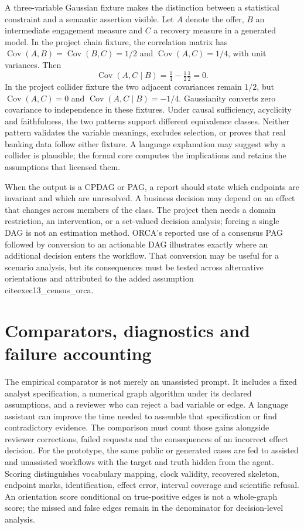 A three-variable Gaussian fixture makes the distinction between a statistical
constraint and a semantic assertion visible. Let $A$ denote the offer, $B$ an
intermediate engagement measure and $C$ a recovery measure in a generated
model. In the project chain fixture, the correlation matrix has
$\operatorname{Cov}(A,B)=\operatorname{Cov}(B,C)=1/2$ and
$\operatorname{Cov}(A,C)=1/4$, with unit variances. Then
\[
 \operatorname{Cov}(A,C\mid B)=\tfrac14-\tfrac12\tfrac12=0.
\]
In the project collider fixture the two adjacent covariances remain $1/2$,
but $\operatorname{Cov}(A,C)=0$ and
$\operatorname{Cov}(A,C\mid B)=-1/4$. Gaussianity converts zero covariance to
independence in these fixtures. Under causal sufficiency, acyclicity and
faithfulness, the two patterns support different equivalence classes. Neither
pattern validates the variable meanings, excludes selection, or proves that
real banking data follow either fixture. A language explanation may suggest
why a collider is plausible; the formal core computes the implications and
retains the assumptions that licensed them.

When the output is a CPDAG or PAG, a report should state which endpoints are
invariant and which are unresolved. A business decision may depend on an effect
that changes across members of the class. The project then needs a domain
restriction, an intervention, or a set-valued decision analysis; forcing a
single DAG is not an estimation method. ORCA's reported use of a consensus PAG
followed by conversion to an actionable DAG illustrates exactly where an
additional decision enters the workflow. That conversion may be useful for a
scenario analysis, but its consequences must be tested across alternative
orientations and attributed to the added assumption \\cite{exec13_census_orca}.

\section{Comparators, diagnostics and failure accounting}

The empirical comparator is not merely an unassisted prompt. It includes a
fixed analyst specification, a numerical graph algorithm under its declared
assumptions, and a reviewer who can reject a bad variable or edge. A language
assistant can improve the time needed to assemble that specification or find
contradictory evidence. The comparison must count those gains alongside
reviewer corrections, failed requests and the consequences of an incorrect
effect decision. For the prototype, the same public or generated cases are
fed to assisted and unassisted workflows with the target and truth hidden
from the agent. Scoring distinguishes vocabulary mapping, clock validity,
recovered skeleton, endpoint marks, identification, effect error, interval
coverage and scientific refusal. An orientation score conditional on
true-positive edges is not a whole-graph score; the missed and false edges
remain in the denominator for decision-level analysis.


